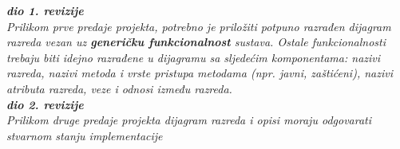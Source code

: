 			\textbf{\textit{dio 1. revizije}}\\
			
			\textit{Prilikom prve predaje projekta, potrebno je priložiti potpuno razrađen dijagram razreda vezan uz \textbf{generičku funkcionalnost} sustava. Ostale funkcionalnosti trebaju biti idejno razrađene u dijagramu sa sljedećim komponentama: nazivi razreda, nazivi metoda i vrste pristupa metodama (npr. javni, zaštićeni), nazivi atributa razreda, veze i odnosi između razreda.}\\
			
			\textbf{\textit{dio 2. revizije}}\\			
			
			\textit{Prilikom druge predaje projekta dijagram razreda i opisi moraju odgovarati stvarnom stanju implementacije}
			
			
			
			\eject
		
			
			
			
			
			
		
			
			
			
		
		

